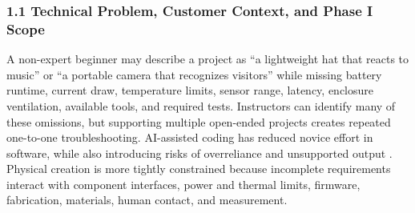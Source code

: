 \documentclass[11pt,letterpaper]{article}
\begin{document}
\subsubsection*{1.1 Technical Problem, Customer Context, and Phase I Scope}

A non-expert beginner may describe a project as ``a lightweight hat that reacts to music'' or ``a portable camera that recognizes visitors'' while missing battery runtime, current draw, temperature limits, sensor range, latency, enclosure ventilation, available tools, and required tests. Instructors can identify many of these omissions, but supporting multiple open-ended projects creates repeated one-to-one troubleshooting. AI-assisted coding has reduced novice effort in software, while also introducing risks of overreliance and unsupported output \cite{liffiton2023codehelp,kazemitabaar2023aicode,kasneci2023chatgpt,yan2024practical,crompton2023highered,southworth2023aicurriculum}. Physical creation is more tightly constrained because incomplete requirements interact with component interfaces, power and thermal limits, firmware, fabrication, materials, human contact, and measurement.
\end{document}
